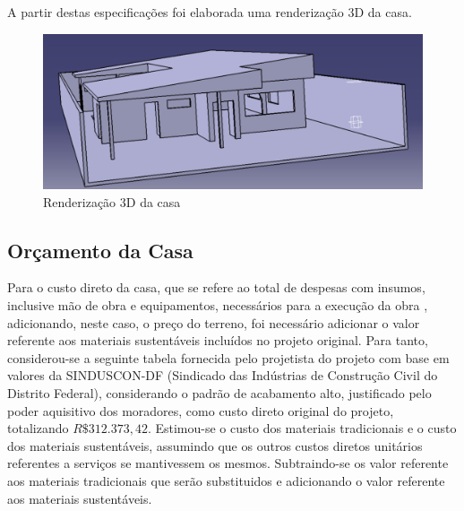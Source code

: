 A partir destas especificações foi elaborada uma renderização 3D da casa.
\newpage

\begin{figure}[H]
  \begin{center}
	\includegraphics[keepaspectratio,scale=0.5,angle=0]{figuras/3d.eps}
	\caption{Renderização 3D da casa}
  \end{center}
\end{figure}

\subsection{Orçamento da Casa}

	Para o custo direto da casa, que se refere ao total de despesas com insumos, inclusive mão de obra e equipamentos, necessários para a execução da obra \cite{IBEC}, adicionando, neste caso, o preço do terreno, foi necessário adicionar o valor referente aos materiais sustentáveis incluídos no projeto original. Para tanto, considerou-se a seguinte tabela fornecida pelo projetista do projeto com base em valores da SINDUSCON-DF (Sindicado das Indústrias de Construção Civil do Distrito Federal), considerando o padrão de acabamento alto, justificado pelo poder aquisitivo dos moradores, como custo direto original do projeto, totalizando $R\$312.373,42$.  Estimou-se o custo dos materiais tradicionais e o custo dos materiais sustentáveis, assumindo que os outros custos diretos unitários referentes a serviços se mantivessem os mesmos. Subtraindo-se os valor referente aos materiais tradicionais que serão substituidos e adicionando o valor referente aos materiais sustentáveis.


